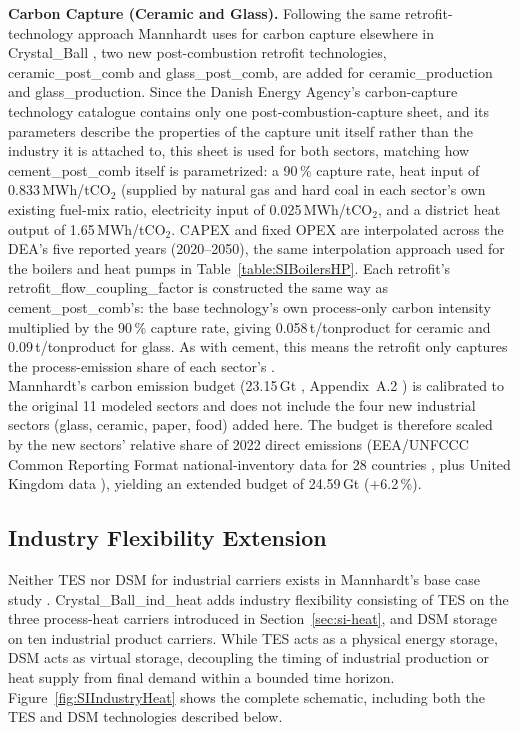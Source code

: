 \textbf{Carbon Capture (Ceramic and Glass).} Following the same retrofit-technology approach Mannhardt uses for carbon capture elsewhere in Crystal\_Ball \cite{Mannhardt2026}, two new post-combustion retrofit technologies, ceramic\_\allowbreak post\_comb and glass\_\allowbreak post\_comb, are added for ceramic\_\allowbreak production and glass\_\allowbreak production. Since the Danish Energy Agency's carbon-capture technology catalogue \cite{DEA_CCS} contains only one post-combustion-capture sheet, and its parameters describe the properties of the capture unit itself rather than the industry it is attached to, this sheet is used for both sectors, matching how cement\_\allowbreak post\_comb itself is parametrized: a 90\,\% capture rate, heat input of 0.833\,MWh/tCO$_2$ (supplied by natural gas and hard coal in each sector's own existing fuel-mix ratio, electricity input of 0.025\,MWh/tCO$_2$, and a district heat output of 1.65\,MWh/tCO$_2$. CAPEX and fixed OPEX are interpolated across the DEA's five reported years (2020--2050), the same interpolation approach used for the boilers and heat pumps in Table~\ref{table:SIBoilersHP}. Each retrofit's retrofit\_\allowbreak flow\_coupling\_\allowbreak factor is constructed the same way as cement\_\allowbreak post\_comb's: the base technology's own process-only carbon intensity multiplied by the 90\,\% capture rate, giving 0.058\,t/tonproduct for ceramic and 0.09\,t/tonproduct for glass. As with cement, this means the retrofit only captures the process-emission share of each sector's . \\


Mannhardt's carbon emission budget (23.15\,Gt , Appendix~A.2 \cite{Mannhardt2026}) is calibrated to the original 11 modeled sectors and does not include the four new industrial sectors (glass, ceramic, paper, food) added here. The budget is therefore scaled by the new sectors' relative share of 2022 direct  emissions (EEA/UNFCCC Common Reporting Format national-inventory data for 28 countries \cite{EEA2026}, plus United Kingdom data \cite{BEIS2023,ONS2026}), yielding an extended budget of 24.59\,Gt (+6.2\,\%).


\subsection{Industry Flexibility Extension}
\label{sec:si-flexibility}

Neither \ac{TES} nor \ac{DSM} for industrial carriers exists in Mannhardt's base case study \cite{Mannhardt2026}. Crystal\_Ball\_ind\_heat adds industry flexibility consisting of \ac{TES} on the three process-heat carriers introduced in Section~\ref{sec:si-heat}, and \ac{DSM} storage on ten industrial product carriers. While TES acts as a physical energy storage, DSM acts as virtual storage, decoupling the timing of industrial production or heat supply from final demand within a bounded time horizon. Figure~\ref{fig:SIIndustryHeat} shows the complete schematic, including both the TES and DSM technologies described below. 

